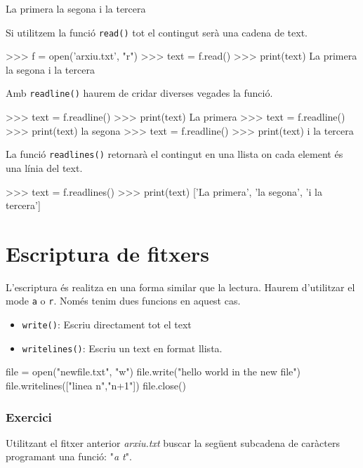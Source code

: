 \begin{blockcode}
La primera
la segona
i la tercera
\end{blockcode}

Si utilitzem la funció {\tt read()} tot el contingut serà una cadena de text.

\begin{blockcode}
>>> f = open('arxiu.txt', "r")
>>> text = f.read()
>>> print(text)
La primera
la segona
i la tercera
\end{blockcode}

Amb {\tt readline()} haurem de cridar diverses vegades la funció.

\begin{blockcode}
>>> text = f.readline()
>>> print(text)
La primera
>>> text = f.readline()
>>> print(text)
la segona
>>> text = f.readline()
>>> print(text)
i la tercera
\end{blockcode}  

La funció {\tt readlines()} retornarà el contingut en una llista on cada element és una línia del text.

\begin{blockcode}
>>> text = f.readlines()
>>> print(text)
['La primera\n', 'la segona\n', 'i la tercera']
\end{blockcode}  

\section{Escriptura de fitxers}

L'escriptura és realitza en una forma similar que la lectura. Haurem d'utilitzar el mode {\tt a} o {\tt r}. Només tenim dues funcions en aquest cas.

\begin{itemize}
\item {\tt write()}: Escriu directament tot el text
\item {\tt writelines()}: Escriu un text en format llista.
\end{itemize}

\begin{blockcode}
file = open("newfile.txt", "w")
file.write("hello world in the new file\n")
file.writelines(["linea n\n","n+1\n"])
file.close()
\end{blockcode}


\subsubsection*{Exercici } 

Utilitzant el fitxer anterior \emph{arxiu.txt} buscar la següent subcadena de caràcters programant una funció: "\emph{a t}".

